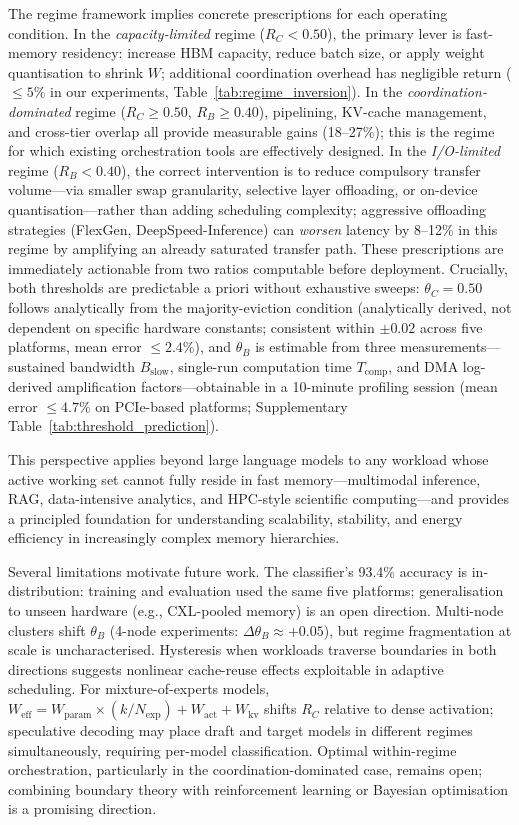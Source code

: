 The regime framework implies concrete prescriptions for each operating
condition.
In the \emph{capacity-limited} regime ($R_C < 0.50$), the primary lever is
fast-memory residency: increase HBM capacity, reduce batch size, or apply
weight quantisation to shrink $W$; additional coordination overhead has
negligible return ($\leq 5\%$ in our experiments, Table~\ref{tab:regime_inversion}).
In the \emph{coordination-dominated} regime ($R_C \geq 0.50$, $R_B \geq 0.40$),
pipelining, KV-cache management, and cross-tier overlap all provide measurable
gains (18--27\%); this is the regime for which existing orchestration tools
are effectively designed.
In the \emph{I/O-limited} regime ($R_B < 0.40$), the correct intervention is
to reduce compulsory transfer volume---via smaller swap granularity, selective
layer offloading, or on-device quantisation---rather than adding scheduling
complexity; aggressive offloading strategies (FlexGen, DeepSpeed-Inference)
can \emph{worsen} latency by 8--12\% in this regime by amplifying an already
saturated transfer path.
These prescriptions are immediately actionable from two ratios computable
before deployment.
Crucially, both thresholds are predictable a priori without exhaustive
sweeps: $\theta_C = 0.50$ follows analytically from the majority-eviction
condition (analytically derived, not dependent on specific hardware constants;
consistent within $\pm 0.02$ across five platforms, mean error $\leq 2.4\%$), and $\theta_B$ is estimable from three measurements---sustained
bandwidth $B_{\mathrm{slow}}$, single-run computation time $T_{\mathrm{comp}}$,
and DMA log-derived amplification factors---obtainable in a 10-minute
profiling session (mean error $\leq 4.7\%$ on PCIe-based platforms;
Supplementary Table~\ref{tab:threshold_prediction}).

This perspective applies beyond large language models to any workload whose
active working set cannot fully reside in fast memory---multimodal inference,
RAG, data-intensive analytics, and HPC-style scientific computing---and
provides a principled foundation for understanding scalability, stability, and
energy efficiency in increasingly complex memory hierarchies.

Several limitations motivate future work.
The classifier's 93.4\% accuracy is in-distribution: training and evaluation
used the same five platforms; generalisation to unseen hardware
(e.g., CXL-pooled memory) is an open direction.
Multi-node clusters shift $\theta_B$ (4-node experiments: $\Delta\theta_B \approx +0.05$),
but regime fragmentation at scale is uncharacterised.
Hysteresis when workloads traverse boundaries in both directions suggests
nonlinear cache-reuse effects exploitable in adaptive scheduling.
For mixture-of-experts models, $W_{\mathrm{eff}} = W_{\mathrm{param}} \times (k/N_{\mathrm{exp}}) + W_{\mathrm{act}} + W_{\mathrm{kv}}$ shifts $R_C$ relative to
dense activation; speculative decoding may place draft and target models in
different regimes simultaneously, requiring per-model classification.
Optimal within-regime orchestration, particularly in the coordination-dominated
case, remains open; combining boundary theory with reinforcement learning or
Bayesian optimisation is a promising direction.
